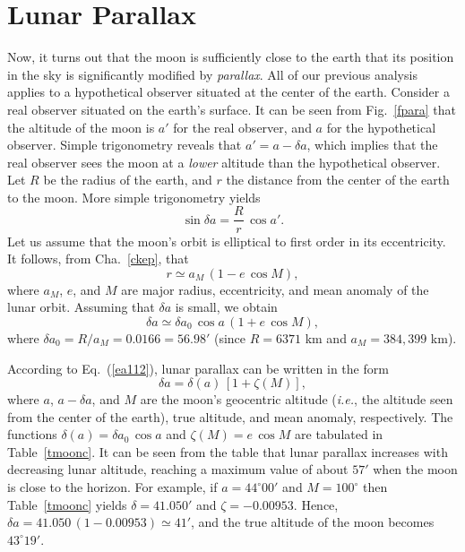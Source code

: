\section{Lunar Parallax}\label{spara}
Now, it turns out that the moon is sufficiently close to the earth that its position in the sky is
significantly modified by {\em parallax}. All of our previous analysis
applies to a hypothetical observer situated at the center of the earth.
Consider a real observer situated on the earth's surface. It can
be seen from Fig.~\ref{fpara} that the altitude of the moon is
$a'$ for the real observer, and $a$ for the hypothetical observer. Simple
trigonometry reveals that $a' = a-\delta a$, which implies that the real
observer sees the moon at a {\em lower}\/ altitude than the hypothetical observer.
Let $R$ be the radius of the earth, and $r$ the distance from the center
of the earth to the moon. More simple trigonometry yields
\begin{equation}
\sin \delta a = \frac{R}{r}\,\cos a'.
\end{equation}
Let us assume that the moon's orbit is elliptical to first order in its
eccentricity. It follows, from Cha.~\ref{ckep}, that
\begin{equation}
r \simeq a_M\,(1 - e\,\cos M),
\end{equation}
where $a_M$, $e$, and $M$ are major radius, eccentricity, and mean
anomaly of the lunar orbit. Assuming that $\delta a$ is small, we
obtain
\begin{equation}\label{ea112}
\delta a \simeq \delta a_0\,\cos a\,(1+e\,\cos M),
\end{equation}
where $\delta a_0 = R/a_M = 0.0166=56.98'$ (since $R=6371$ km and $a_M=384,399$ km). 

According to Eq.~(\ref{ea112}), lunar parallax can be written in the form
\begin{equation}
\delta a = \delta (a)\,[1+\zeta (M)],
\end{equation}
where $a$, $a-\delta a$, and $M$ are the moon's geocentric altitude ({\em i.e.}, the altitude seen from the center of the earth), true
altitude, and mean anomaly, respectively. The functions $\delta(a)=\delta a_0\,\cos a$ and
$\zeta (M)= e\,\cos M$ are tabulated in Table~\ref{tmoonc}. It can be seen from the
table that lunar parallax increases with decreasing lunar altitude, reaching a maximum value of about $57'$ when the moon is close to the horizon.
For example, if $a=44^\circ 00'$ and $M=100^\circ$ then Table~\ref{tmoonc}
yields $\delta = 41.050'$ and $\zeta =- 0.00953$. Hence, $\delta a = 41.050\,(1-0.00953) \simeq 41'$, and the true altitude of the moon becomes
$43^\circ 19'$. 

